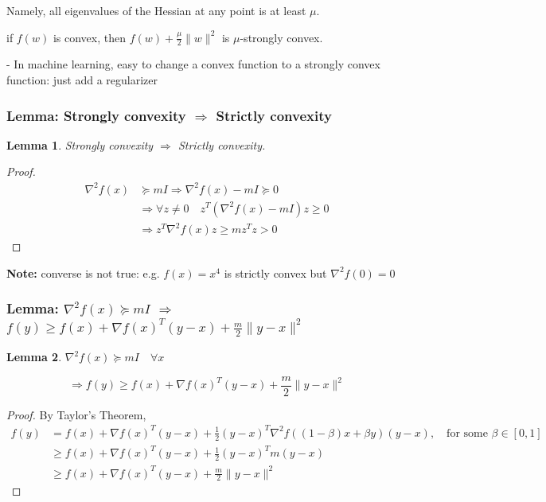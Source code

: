 \documentclass[11pt,a4paper]{article}
\newtheorem{lemma}{Lemma}
\begin{document}
Namely, all eigenvalues of the Hessian at any point is at least $\mu$.

if $f(w)$ is convex, then $f(w)+\frac{\mu}{2}\|w\|^{2}$ is $\mu$-strongly convex.

- In machine learning, easy to change a convex function to a strongly convex function: just add a regularizer

\subsubsection{Lemma: Strongly convexity $\Rightarrow$ Strictly convexity}
\begin{lemma}
    Strongly convexity $\Rightarrow$ Strictly convexity.
\end{lemma}
\begin{proof}
\begin{equation}
    \begin{aligned}
        \nabla^2 f(x)&\succeq mI \Rightarrow \nabla^2 f(x)-mI\succeq 0\\
        & \Rightarrow \forall z\neq 0\quad z^T(\nabla^2 f(x)-mI)z\geq 0\\
        & \Rightarrow z^T\nabla^2 f(x)z\geq mz^Tz>0
    \end{aligned}
    \nonumber
\end{equation}
\end{proof}
\textbf{Note: }converse is not true: e.g. $f(x)=x^4$ is strictly convex but $\nabla^2 f(0)=0$

\subsubsection{Lemma: $\nabla^2 f(x)\succeq mI$ $\Rightarrow$ $f(y)\geq f(x)+\nabla f(x)^T(y-x)+\frac{m}{2}\|y-x\|^2$}
\begin{lemma}
$\nabla^2 f(x)\succeq mI\quad \forall x$

$$\Rightarrow f(y)\geq f(x)+\nabla f(x)^T(y-x)+\frac{m}{2}\|y-x\|^2$$
\end{lemma}
\begin{proof}
    By Taylor's Theorem,
    \begin{equation}
        \begin{aligned}
            f(y)&=f(x)+\nabla f(x)^T(y-x)+\frac{1}{2}(y-x)^T \nabla^2 f((1-\beta)x+\beta y)(y-x),\quad \text{for some }\beta\in[0,1]\\
            &\geq f(x)+\nabla f(x)^T(y-x)+\frac{1}{2}(y-x)^Tm(y-x)\\
            &\geq f(x)+\nabla f(x)^T(y-x)+\frac{m}{2}\|y-x\|^2
        \end{aligned}
        \nonumber
    \end{equation}
\end{proof}
\end{document}
